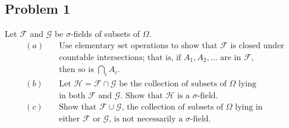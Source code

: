\documentclass[letterpaper, 11pt]{article}
\newcommand{\1}{\mathds{1}}	%
\theoremstyle{definition}
\begin{document}
\subsection*{Problem 1}
Let $\mathcal{F}$ and $\mathcal{G}$ be $\sigma$-fields of subsets of $\Omega$.
\begin{align*}
(a)\quad& \text{Use elementary set operations to show that $\mathcal{F}$ is closed under}\\
  & \text{countable intersections; that is, if $A_1, A_2, \ldots$ are in $\mathcal{F}$,}\\
  & \text{then so is $\bigcap_i A_i$.}\\
(b)\quad& \text{Let $\mathcal{H} = \mathcal{F} \cap \mathcal{G}$ be the collection of subsets of $\Omega$ lying}\\
  & \text{in both $\mathcal{F}$ and $\mathcal{G}$. Show that $\mathcal{H}$ is a $\sigma$-field.}\\
(c)\quad& \text{Show that $\mathcal{F} \cup \mathcal{G}$, the collection of subsets of $\Omega$ lying in}\\
  & \text{either $\mathcal{F}$ or $\mathcal{G}$, is not necessarily a $\sigma$-field.}
\end{align*}
\end{document}
